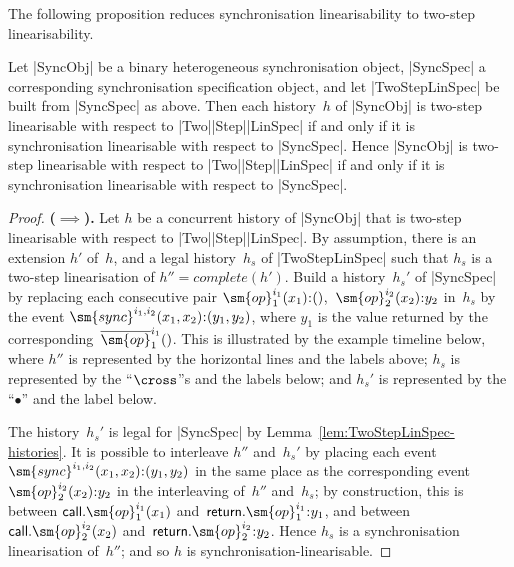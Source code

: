 The following proposition reduces synchronisation linearisability to two-step
linearisability.
%
\begin{prop}
\label{prop:two-step-lin}
Let |SyncObj| be a binary heterogeneous synchronisation object, |SyncSpec| a
corresponding synchronisation specification object, and let |TwoStepLinSpec|
be built from |SyncSpec| as above.  Then each history~$h$ of |SyncObj| is
two-step linearisable with respect to |Two|\-|Step|\-|LinSpec| if and only if
it is synchronisation linearisable with respect to |SyncSpec|.  Hence
|SyncObj| is two-step linearisable with respect to |Two|\-|Step|\-|LinSpec| if
and only if it is synchronisation linearisable with respect to |SyncSpec|.
\end{prop}
\begin{proof}
\textbf{($\implies$).}\quad
%
Let $h$ be a concurrent history of |SyncObj| that is two-step linearisable
with respect to |Two|\-|Step|\-|LinSpec|.  By assumption, there is an
extension $h'$ of~$h$, and a legal history~$h_s$ of |TwoStepLinSpec| such that
$h_s$ is a  two-step linearisation of $h'' = complete(h')$.
%
Build a history~$h_s'$ of |SyncSpec| by replacing each consecutive pair
$\sm{op}_1^{i_1}(x_1) \:: ()$,\, $\sm{op}_2^{i_2}(x_2) \:: y_2$ in~$h_s$ by
the event $\sm{sync}^{i_1,i_2}(x_1,x_2) \:: (y_1,y_2)$, where $y_1$ is the
value returned by the corresponding~$\overline{\sm{op}}_1^{i_1}()$.
%
This is illustrated by the example timeline below, where $h''$ is represented
by the horizontal lines and the labels above; $h_s$ is represented by the
``$\cross$''s and the labels below; and $h_s'$ is represented by the
``$\bullet$'' and the label below.
%
\begin{center}
\end{center}

The history~$h_s'$ is legal for |SyncSpec| by
Lemma~\ref{lem:TwoStepLinSpec-histories}.
%
It is possible to interleave $h''$ and~$h_s'$ by placing each event
$\sm{sync}^{i_1,i_2}(x_1,x_2) \:: (y_1,y_2)$ in the same place as the
corresponding event $\sm{op}_2^{i_2}(x_2) \:: y_2$ in the interleaving
of~$h''$ and~$h_s$; by construction, this is between
$\call.\sm{op}_1^{i_1}(x_1)$ and~$\return.\sm{op}_1^{i_1} \:: y_1$, and
between $\call.\sm{op}_2^{i_2}(x_2)$ and~$\return.\sm{op}_2^{i_2} \:: y_2$.
%
Hence $h_s$ is a synchronisation linearisation of~$h''$; and so $h$ is
synchronisation-linearisable.


\end{proof}
